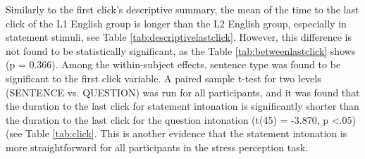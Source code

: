 \documentclass[a4paper]{article}
\begin{document}

Similarly to the first click's descriptive summary, the mean of the time to the last click of the L1 English group is longer than the L2 English group, especially in statement stimuli, see Table \ref{tab:descriptivelastclick}. However, this difference is not found to be statistically significant, as the Table \ref{tab:betweenlastclick} shows (p = 0.366). Among the within-subject effects, sentence type was found to be significant to the first click variable. A paired sample t-test for two levels (SENTENCE vs. QUESTION) was run for all participants, and it was found that the duration to the last click for statement intonation is significantly shorter than the duration to the last click for the question intonation (t(45) = -3.870, p \textless .05) (see Table \ref{tab:click}. This is another evidence that the statement intonation is more straightforward for all participants in the stress perception task.
\end{document}

